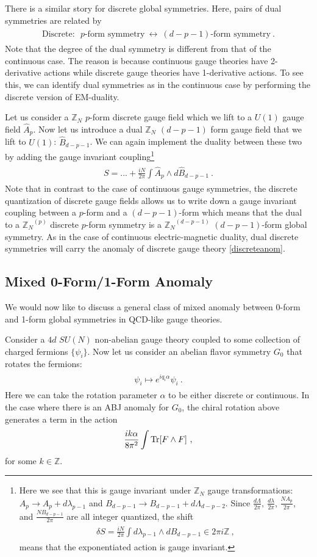 \documentclass[11pt]{article}
\newcommand{\eq}[1]{\begin{align}\begin{split}#1\end{split}\end{align}}
\newcommand{\twopi}[1]{{\frac{#1}{2\pi}}}
\def\Tr{{\rm Tr}}
\def\IZ{{\mathbb{Z}}}
\def\IZN{{\mathbb{Z}_N}}
\begin{document}
 


There is a similar story for discrete global symmetries. Here, pairs of dual symmetries are related by 
\eq{
\text{Discrete:~~} p\text{-form symmetry}~\longleftrightarrow~ (d-p-1)\text{-form symmetry}~.
} 
Note that the degree of the dual symmetry is different from that of the continuous case. The reason is because continuous gauge theories have 2-derivative actions while discrete gauge theories have 1-derivative actions. 
To see this, we can identify dual symmetries as in the continuous case by performing the discrete version of EM-duality. 

Let us consider a $\IZ_N$ $p$-form discrete gauge field which we lift to a $U(1)$ gauge field $\hat{A}_p$. Now let us introduce a dual $\IZ_N$ $(d-p-1)$ form gauge field that we lift to $U(1)$: $\hat{B}_{d-p-1}$. We can again implement the duality between these two by adding the gauge invariant coupling\footnote{
Here we see that this is gauge invariant under $\IZ_N$ gauge transformations: $A_p\to A_p+d\lambda_{p-1}$ and $B_{d-p-1}\to B_{d-p-1}+d\Lambda_{d-p-2}$. Since $\twopi{d\Lambda},\ \twopi{d\lambda}$, $\twopi{N A_p}$, and $\twopi{N B_{d-p-1}}$ are all integer quantized, the shift 
\eq{
\delta S=\twopi{i N}\int d\lambda_{p-1}\wedge dB_{d-p-1}\in 2\pi i \IZ~,
}
means that the exponentiated action is gauge invariant.}
\eq{
S=...+\twopi{i N} \int \hat{A}_p\wedge d\hat{B}_{d-p-1}~.
} Note that in contrast to the case of continuous gauge symmetries, the discrete quantization of discrete gauge fields allows us to write down a gauge invariant  coupling between a $p$-form and a $(d-p-1)$-form which means that the dual to a $\IZN^{(p)}$ discrete $p$-form symmetry is a $\IZN^{(d-p-1)}$ $(d-p-1)$-form global symmetry.  
  As in the case of continuous electric-magnetic duality, dual discrete symmetries will carry the anomaly of discrete gauge theory \eqref{discreteanom}.


 

\subsection{Mixed 0-Form/1-Form Anomaly}
 
We would now like to discuss a general class of mixed anomaly between 0-form and 1-form global symmetries in QCD-like gauge theories. 

Consider a $4d$  $SU(N)$ non-abelian gauge theory coupled to some collection of charged fermions $\{\psi_i\}$. Now let us consider an abelian flavor symmetry $G_0$ that rotates the fermions:
\eq{
\psi_i \longmapsto e^{i q_i \alpha} \psi_i~. 
}
Here we can take the rotation parameter $\alpha$ to be either discrete or continuous. In the case where there is an ABJ anomaly for $G_0$, the chiral rotation above generates a term in the action 
\eq{
\frac{i k \alpha}{8\pi^2}\int \Tr[F\wedge F]~,
}
for some $k\in \IZ$. 
\end{document}

